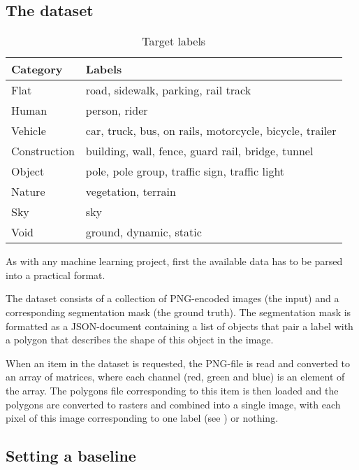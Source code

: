 \subsection{The dataset}
\label{sec:dataset}

\begin{table}
    \centering
    \caption{Target labels}
    \label{tab:labels}
    \begin{tabular}{ll}
        \hline
        Category    & Labels \\
        \hline
        Flat        & road, sidewalk, parking, rail track \\
        Human       & person, rider \\
        Vehicle     & car, truck, bus, on rails, motorcycle, bicycle, trailer \\
        Construction& building, wall, fence, guard rail, bridge, tunnel \\
        Object      & pole, pole group, traffic sign, traffic light \\
        Nature      & vegetation, terrain \\
        Sky	        & sky \\
        Void        & ground, dynamic, static \\
        \hline
    \end{tabular}
\end{table}

As with any machine learning project, first the available data has to be parsed into a practical format.

The dataset consists of a collection of PNG-encoded images (the input) and a corresponding segmentation mask (the ground truth). The segmentation mask is formatted as a JSON-document containing a list of objects that pair a label with a polygon that describes the shape of this object in the image.

When an item in the dataset is requested, the PNG-file is read and converted to an array of matrices, where each channel (red, green and blue) is an element of the array. 
The polygons file corresponding to this item is then loaded and the polygons are converted to rasters and combined into a single image, with each pixel of this image corresponding to one label (see ) or nothing.

\subsection{Setting a baseline}
\label{subsec:baseline}

